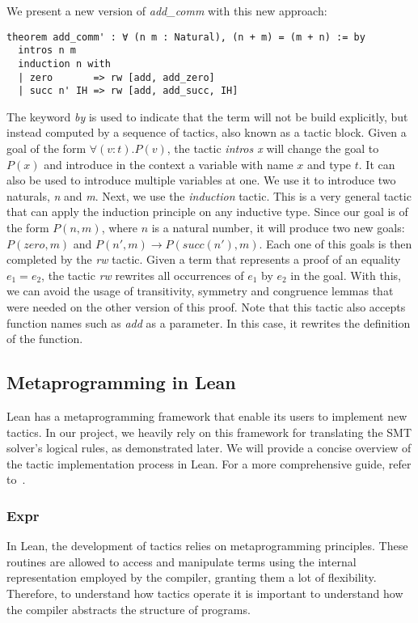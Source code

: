 We present a new version of \textit{add\_comm} with this new approach:

\begin{verbatim}
theorem add_comm' : ∀ (n m : Natural), (n + m) = (m + n) := by
  intros n m
  induction n with
  | zero       => rw [add, add_zero]
  | succ n' IH => rw [add, add_succ, IH]
\end{verbatim}

The keyword \textit{by} is used to indicate that the term will not be build explicitly, but instead computed by a sequence of tactics, also known as a tactic block. Given a goal of the form $\forall (v : t) . P(v)$, the tactic \textit{intros x} will change the goal to $P(x)$ and introduce in the context a variable with name $x$ and type $t$. It can also be used to introduce multiple variables at one. We use it to introduce two naturals, \textit{n} and \textit{m}. Next, we use the \textit{induction} tactic. This is a very general tactic that can apply the induction principle on any inductive type. Since our goal is of the form $P(n, m)$, where $n$ is a natural number, it will produce two new goals: $P(zero, m)$ and $P(n', m) \rightarrow P(succ(n'), m)$. Each one of this goals is then completed by the \textit{rw} tactic. Given a term that represents a proof of an equality $e_{1} = e_{2}$, the tactic \textit{rw} rewrites all occurrences of $e_{1}$ by $e_{2}$ in the goal. With this, we can avoid the usage of transitivity, symmetry and congruence lemmas that were needed on the other version of this proof. Note that this tactic also accepts function names such as \textit{add} as a parameter. In this case, it rewrites the definition of the function.

\subsection{Metaprogramming in Lean}

Lean has a metaprogramming framework that enable its users to implement new tactics. In our project, we heavily rely on this framework for translating the SMT solver's logical rules, as demonstrated later. We will provide a concise overview of the tactic implementation process in Lean. For a more comprehensive guide, refer to~\cite{metaLean}.

\subsubsection{Expr}

In Lean, the development of tactics relies on metaprogramming principles. These routines are allowed to access and manipulate terms using the internal representation employed by the compiler, granting them a lot of flexibility. Therefore, to understand how tactics operate it is important to understand how the compiler abstracts the structure of programs.

